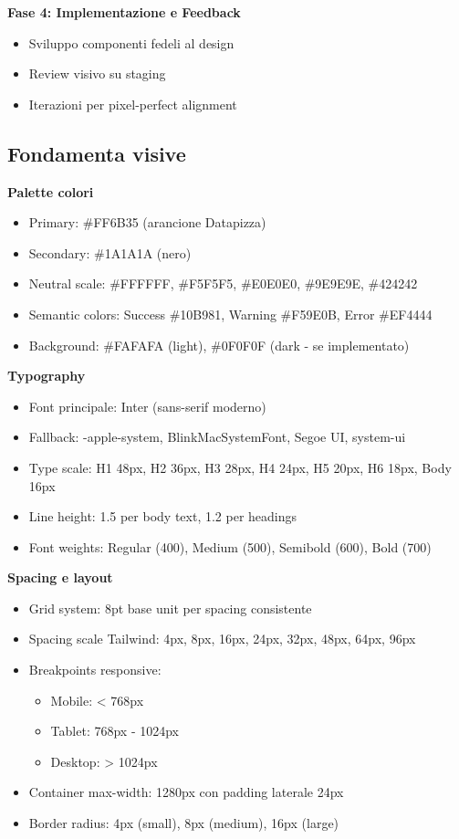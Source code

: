\textbf{Fase 4: Implementazione e Feedback}
\begin{itemize}
  \item Sviluppo componenti fedeli al design
  \item Review visivo su staging
  \item Iterazioni per pixel-perfect alignment
\end{itemize}

\subsection{Fondamenta visive}
\textbf{Palette colori}
\begin{itemize}
  \item Primary: \#FF6B35 (arancione Datapizza)
  \item Secondary: \#1A1A1A (nero)
  \item Neutral scale: \#FFFFFF, \#F5F5F5, \#E0E0E0, \#9E9E9E, \#424242
  \item Semantic colors: Success \#10B981, Warning \#F59E0B, 
        Error \#EF4444
  \item Background: \#FAFAFA (light), \#0F0F0F (dark - se implementato)
\end{itemize}

\textbf{Typography}
\begin{itemize}
  \item Font principale: Inter (sans-serif moderno)
  \item Fallback: -apple-system, BlinkMacSystemFont, Segoe UI, system-ui
  \item Type scale: H1 48px, H2 36px, H3 28px, H4 24px, H5 20px, 
        H6 18px, Body 16px
  \item Line height: 1.5 per body text, 1.2 per headings
  \item Font weights: Regular (400), Medium (500), Semibold (600), 
        Bold (700)
\end{itemize}

\textbf{Spacing e layout}
\begin{itemize}
  \item Grid system: 8pt base unit per spacing consistente
  \item Spacing scale Tailwind: 4px, 8px, 16px, 24px, 32px, 48px, 
        64px, 96px
  \item Breakpoints responsive:
    \begin{itemize}
      \item Mobile: < 768px
      \item Tablet: 768px - 1024px
      \item Desktop: > 1024px
    \end{itemize}
  \item Container max-width: 1280px con padding laterale 24px
  \item Border radius: 4px (small), 8px (medium), 16px (large)
\end{itemize}

